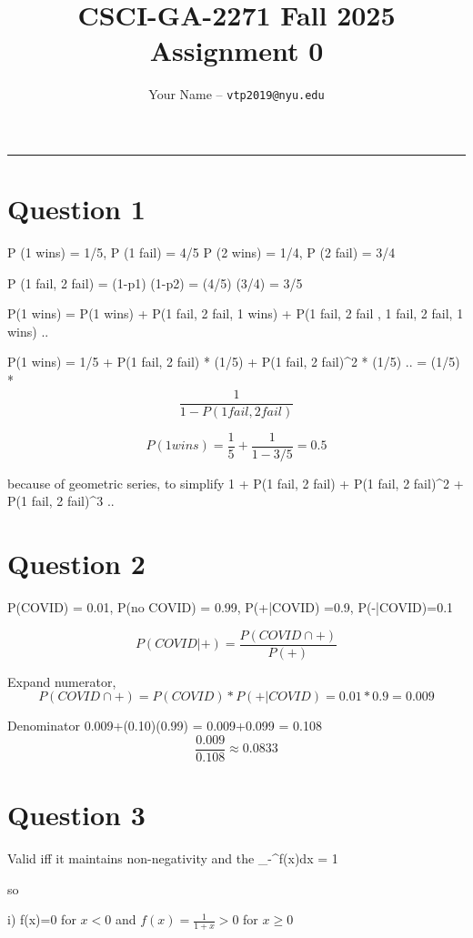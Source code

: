\documentclass[12pt]{article}
\title{CSCI-GA-2271 Fall 2025 Assignment 0}
\author{Your Name -- \texttt{vtp2019@nyu.edu}}
\begin{document}
\maketitle

\noindent
\rule{\linewidth}{0.4pt}

\section*{Question 1} 
P (1 wins) = 1/5, P (1 fail) = 4/5 P (2 wins) = 1/4, P (2 fail) = 3/4

P (1 fail, 2 fail) = (1-p1) (1-p2) = (4/5) (3/4) = 3/5 

P(1 wins) = P(1 wins) + P(1 fail, 2 fail, 1 wins) + P(1 fail, 2 fail , 1 fail, 2 fail, 1 wins) ..

P(1 wins) = 1/5 + P(1 fail, 2 fail) * (1/5) + P(1 fail, 2 fail)^2 * (1/5) .. = (1/5) * $$\frac{1}{1-P(1 fail, 2 fail)}$$ 

$$P(1 wins) = \frac{1}{5} + \frac{1}{1-3/5} = 0.5$$

because of geometric series, to simplify 1 + P(1 fail, 2 fail) + P(1 fail, 2 fail)^2 + P(1 fail, 2 fail)^3 ..

\vspace{10cm}

\newpage

\section*{Question 2} 
P(COVID) = 0.01, P(no COVID) = 0.99, P(+|COVID) =0.9, P(-|COVID)=0.1

$$P(COVID|+) = \frac{P(COVID\cap +)}{P(+)}$$

Expand numerator, $$P(COVID\cap+) = P(COVID)*P(+|COVID) = 0.01*0.9 =0.009$$

Denominator 0.009+(0.10)(0.99) = 0.009+0.099 = 0.108
$$\frac{0.009}{0.108} \approx 0.0833$$
\vspace{10cm}

\newpage

\section*{Question 3} 
Valid iff it maintains non-negativity and the \int_{-\infty}^{\infty}f(x)dx = 1

so 

i) f(x)=0 for $x < 0$  and $f(x)=\frac{1}{1+x} > 0$ for $x \geq 0$ 

\vspace{1cm}
\end{document}
